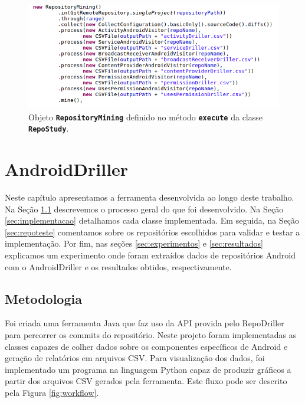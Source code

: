 \documentclass[a4paper,12pt]{article}
\begin{document}
\begin{figure}[h]
\centering
\includegraphics[width=\linewidth]{imgs/repostudy.png}
\caption{Objeto {\small\texttt{\textbf{RepositoryMining}}} definido no método {\small\texttt{\textbf{execute}}} da classe {\small\texttt{\textbf{RepoStudy}}}.}
\label{fig:repostudy}
\end{figure}



\newpage
\section{AndroidDriller}%

Neste capítulo apresentamos a ferramenta desenvolvida ao longo deste trabalho. Na Seção \ref{sec:metodologia} descrevemos o processo geral do que foi desenvolvido. Na Seção \ref{sec:implementacao} detalhamos cada classe implementada. Em seguida, na Seção \ref{sec:repoteste} comentamos sobre os repositórios escolhidos para validar e testar a implementação. Por fim, nas seções \ref{sec:experimentos} e \ref{sec:resultados} explicamos um experimento onde foram extraídos dados de repositórios Android com o AndroidDriller  e os resultados obtidos, respectivamente.

\subsection{Metodologia}
\label{sec:metodologia}
Foi criada uma ferramenta Java que faz uso da API provida pelo RepoDriller para percorrer os commits do repositório. Neste projeto foram implementadas as classes capazes de colher dados sobre os componentes específicos de Android e geração de relatórios em arquivos CSV. Para visualização dos dados, foi implementado um programa na linguagem Python capaz de produzir gráficos a partir dos arquivos CSV gerados pela ferramenta. Este fluxo pode ser descrito pela Figura \ref{fig:workflow}. 
\end{document}
